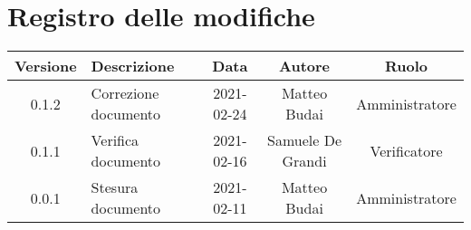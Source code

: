 \section*{Registro delle modifiche}

\begin{center}
	\begin{longtable}{|c|p{5cm}|c|c|c|}
	\hline
	\rowcolor{lighter-grayer}
	\textbf{Versione} & \textbf{Descrizione} & \textbf{Data} & \textbf{Autore} & \textbf{Ruolo} \\
	\hline
	\endfirsthead


	\hline
	0.1.2 & Correzione documento & 2021-02-24 & Matteo Budai & Amministratore \\
	\hline
	0.1.1 & Verifica documento & 2021-02-16 & Samuele De Grandi & Verificatore \\
	\hline
	0.0.1 & Stesura documento & 2021-02-11 & Matteo Budai & Amministratore \\
	\hline
	\end{longtable}
\end{center}
